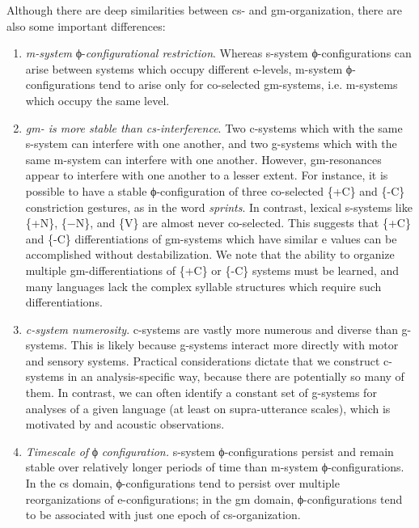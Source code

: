 Although there are deep similarities between cs- and gm-or\-ga\-ni\-za\-tion, there are also some important differences: 

\begin{enumerate}
\item \textit{m-system} ϕ-\textit{configurational restriction}. Whereas s-system ϕ-configurations can arise between systems which occupy different e-levels, m-system ϕ-configurations tend to arise only for co-selected gm-systems, i.e. m-sys\-tems which occupy the same level. 

\item \textit{gm- is more stable than cs-interference}. Two c-systems which  with the same s-system can interfere with one another, and two g-systems which  with the same m-system can interfere with one another. However, gm-resonances appear to interfere with one another to a lesser extent. For instance, it is possible to have a stable ϕ-configuration of three co-selected \{+C\} and \{-C\} constriction gestures, as in the word \textit{sprints}. In contrast, lexical s-systems like \{+N\}, \{−N\}, and \{V\} are almost never co-selected. This suggests that \{+C\} and \{-C\} differentiations of gm-systems which have similar e values can be accomplished without destabilization. We note that the ability to organize multiple gm-differentiations of \{+C\} or \{-C\} systems must be learned, and many languages lack the complex syllable structures which require such differentiations.

\item \textit{c-system numerosity}. c-systems are vastly more numerous and diverse than g-systems. This is likely because g-systems interact more directly with motor and sensory systems. Practical considerations dictate that we construct c-systems in an analysis-specific way, because there are potentially so many of them. In contrast, we can often identify a constant set of g-systems for analyses of a given language (at least on supra-utterance scales), which is motivated  by  and acoustic observations.

\item  \textit{Timescale of} ϕ \textit{configuration.} s-system ϕ-configurations persist and remain stable over relatively longer periods of time than m-system ϕ-con\-fig\-u\-ra\-tions. In the cs domain, ϕ-configurations tend to persist over multiple reorganizations of e-configurations; in the gm domain, ϕ-configurations tend to be associated with just one epoch of cs-organization.
\end{enumerate}

